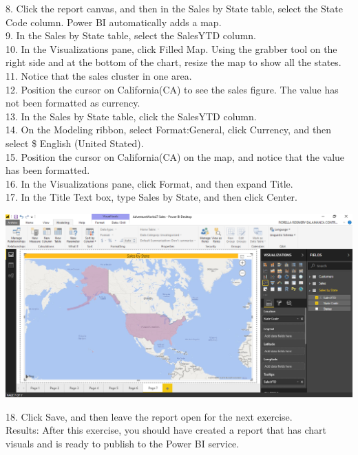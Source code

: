 8. Click the report canvas, and then in the Sales by State table, select the State Code column. Power BI
automatically adds a map.\\
9. In the Sales by State table, select the SalesYTD column.\\
10. In the Visualizations pane, click Filled Map. Using the grabber tool on the right side and at the
bottom of the chart, resize the map to show all the states.\\
11. Notice that the sales cluster in one area.\\
12. Position the cursor on California(CA) to see the sales figure. The value has not been formatted as
currency.\\
13. In the Sales by State table, click the SalesYTD column.\\
14. On the Modeling ribbon, select Format:General, click Currency, and then select \$ English (United
Stated).\\
15. Position the cursor on California(CA) on the map, and notice that the value has been formatted.\\
16. In the Visualizations pane, click Format, and then expand Title.\\
17. In the Title Text box, type Sales by State, and then click Center.\\

	\begin{center}
	\includegraphics[width=17cm]{./Imagenes/Ejercicio2/Tarea2/2}
	\end{center}	

18. Click Save, and then leave the report open for the next exercise.\\
Results: After this exercise, you should have created a report that has chart visuals and is ready to publish to the Power BI service.